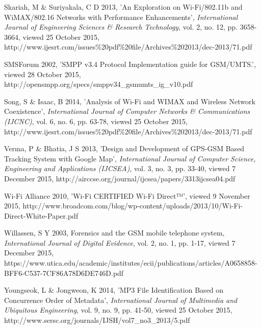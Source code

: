 \documentclass[12pt,svgnames,smaller]{article} %
\begin{document}
\begin{thebibliography}{ 10 }
		
		Skariah, M \& Suriyakala, C D 2013, 'An Exploration on Wi-Fi/802.11b and WiMAX/802.16 Networks with Performance Enhancements', \emph{International Journal of Engineering Sciences \& Research Technology}, vol. 2, no. 12, pp. 3658-3664, viewed 25 October 2015, http://www.ijesrt.com/issues\%20pdf\%20file/Archives\%202013/dec-2013/71.pdf
		
		
		SMSForum 2002, 'SMPP v3.4 Protocol Implementation guide for GSM/UMTS.', viewed 28 October 2015, http://opensmpp.org/specs/smppv34\_gsmumts\_ig\_v10.pdf
		
		
		Song, S \& Isaac, B 2014, 'Analysis of Wi-Fi and WIMAX and Wireless Network Coexistence', \emph{International Journal of Computer Networks \& Communications (IJCNC)}, vol. 6, no. 6, pp. 63-78, viewed 25 October 2015, http://www.ijesrt.com/issues\%20pdf\%20file/Archives\%202013/dec-2013/71.pdf
		
		
		Verma, P \& Bhatia, J S 2013, 'Design and Development of GPS-GSM Based Tracking System with Google Map', \emph{International Journal of Computer Science, Engineering and Applications (IJCSEA)}, vol. 3, no. 3, pp. 33-40, viewed 7 December 2015, http://airccse.org/journal/ijcsea/papers/3313ijcsea04.pdf
		
		
		Wi-Fi Alliance 2010, 'Wi-Fi CERTIFIED Wi-Fi Direct™', viewed 9 November 2015, http://www.broadcom.com/blog/wp-content/uploads/2013/10/Wi-Fi-Direct-White-Paper.pdf
		
		
		Willassen, S Y 2003, Forensics and the GSM mobile telephone system, \emph{International Journal of Digital Evidence}, vol. 2, no. 1, pp. 1-17, viewed 7 December 2015, https://www.utica.edu/academic/institutes/ecii/publications/articles/A0658858-BFF6-C537-7CF86A78D6DE746D.pdf

		
		Youngseok, L \& Jongweon, K 2014, 'MP3 File Identification Based on Concurrence Order of Metadata', \emph{International Journal of Multimedia and Ubiquitous Engineering}, vol. 9, no. 9, pp. 41-50, viewed 25 October 2015, http://www.sersc.org/journals/IJSH/vol7\_no3\_2013/5.pdf
		
	\end{thebibliography}
	
	
\end{document}

